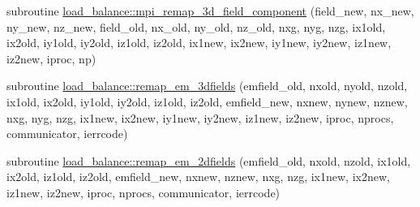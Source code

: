 \begin{DoxyCompactItemize}
subroutine \hyperlink{namespaceload__balance_a39e48009fed76be1c45b695d0c18579f}{load\+\_\+balance\+::mpi\+\_\+remap\+\_\+3d\+\_\+field\+\_\+component} (field\+\_\+new, nx\+\_\+new, ny\+\_\+new, nz\+\_\+new,                                                                                                                                                                                                                           field\+\_\+old, nx\+\_\+old, ny\+\_\+old, nz\+\_\+old,                                                                                                                                                                                                                           nxg, nyg, nzg,                                                                                                                                                                                                                                                                                                       ix1old, ix2old, iy1old, iy2old, iz1old, iz2old,                                                                                                                                                           ix1new, ix2new, iy1new, iy2new, iz1new, iz2new,                                                                                                                                                           iproc, np)
\item 
subroutine \hyperlink{namespaceload__balance_a87910b5d990f9577ace6192cae34adee}{load\+\_\+balance\+::remap\+\_\+em\+\_\+3dfields} (emfield\+\_\+old, nxold, nyold, nzold,                                                                                                                                                               ix1old, ix2old, iy1old, iy2old, iz1old, iz2old,                                                                                                                       emfield\+\_\+new, nxnew, nynew, nznew, nxg, nyg, nzg,                                                                                                                       ix1new, ix2new, iy1new, iy2new, iz1new, iz2new,                                                                                                                       iproc, nprocs, communicator, ierrcode)
\item 
subroutine \hyperlink{namespaceload__balance_a63d87c1dde6113bc22318b1869514c59}{load\+\_\+balance\+::remap\+\_\+em\+\_\+2dfields} (emfield\+\_\+old, nxold, nzold,                                                                                                                                                               ix1old, ix2old, iz1old, iz2old,                                                                                                                                                       emfield\+\_\+new, nxnew, nznew, nxg, nzg,                                                                                                                                       ix1new, ix2new, iz1new, iz2new,                                                                                                                                                       iproc, nprocs, communicator, ierrcode)

\end{DoxyCompactItemize}
